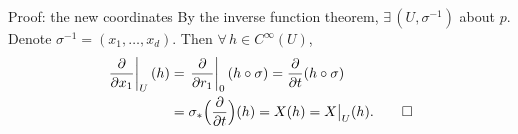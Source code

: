 \documentclass[10pt]{beamer}
\begin{document}
\begin{frame}{Proof: the new coordinates}
	By the inverse function theorem, $\exists\, (U, \sigma^{-1})$ about
	$p$. Denote $\sigma^{-1} = (x_1, \dots, x_d)$. Then
	$\forall\, h \in C^\infty(U)$,
	\begin{align*}
		\left. \frac{\partial}{\partial x_1} \right|_{U} (h)
		 & = \left. \frac{\partial}{\partial r_1} \right|_{0}
		(h \circ \sigma)
		= \frac{\partial}{\partial t} (h \circ \sigma)  \\
		 & = \sigma_*\Bigl( \frac{\partial}{\partial t} \Bigr) (h)
		= X(h) = X\big|_U (h). \qedhere
	\end{align*}
\end{frame}
\end{document}
